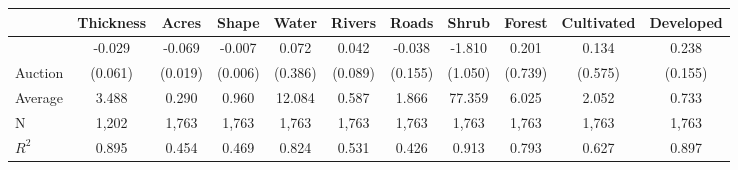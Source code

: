 
\begin{tabular}{lcccccccccc}
\toprule
 & Thickness & Acres & Shape & Water & Rivers & Roads & Shrub & Forest & Cultivated & Developed\\
\midrule
 & -0.029 & -0.069 & -0.007 & 0.072 & 0.042 & -0.038 & -1.810 & 0.201 & 0.134 & 0.238\\

\multirow{-2}{*}{\raggedright\arraybackslash Auction} & (0.061) & (0.019) & (0.006) & (0.386) & (0.089) & (0.155) & (1.050) & (0.739) & (0.575) & (0.155)\\

\midrule
Average & 3.488 & 0.290 & 0.960 & 12.084 & 0.587 & 1.866 & 77.359 & 6.025 & 2.052 & 0.733\\

N & 1,202 & 1,763 & 1,763 & 1,763 & 1,763 & 1,763 & 1,763 & 1,763 & 1,763 & 1,763\\

$R^2$ & 0.895 & 0.454 & 0.469 & 0.824 & 0.531 & 0.426 & 0.913 & 0.793 & 0.627 & 0.897\\
\bottomrule
\end{tabular}
